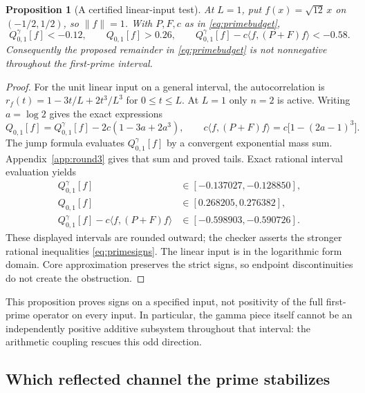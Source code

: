 \documentclass[11pt]{article}
\numberwithin{equation}{section}
\newtheorem{proposition}[theorem]{Proposition}
\theoremstyle{definition}
\theoremstyle{remark}
\newcommand{\norm}[1]{\lVert#1\rVert}
\newcommand{\ip}[2]{\langle#1,#2\rangle}
\newcommand{\Qgam}{Q^{\gamma}}
\begin{document}
\begin{proposition}[A certified linear-input test]\label{prop:primestabilizes}
At $L=1$, put $f(x)=\sqrt{12}\,x$ on $(-1/2,1/2)$, so $\norm f=1$.
With $P,F,c$ as in \eqref{eq:primebudget},
\begin{equation}
\Qgam_{0,1}[f]<-0.12,\qquad Q_{0,1}[f]>0.26,\qquad
\Qgam_{0,1}[f]-c\ip f{(P+F)f}<-0.58.
\label{eq:primesigns}
\end{equation}
Consequently the proposed remainder in \eqref{eq:primebudget} is not
nonnegative throughout the first-prime interval.
\end{proposition}
\begin{proof}
For the unit linear input on a general interval, the autocorrelation is
$r_f(t)=1-3t/L+2t^3/L^3$ for $0\leq t\leq L$. At $L=1$ only $n=2$
is active. Writing $a=\log2$ gives the exact expressions
\[
Q_{0,1}[f]=\Qgam_{0,1}[f]-2c(1-3a+2a^3),\qquad
c\ip f{(P+F)f}=c\bigl[1-(2a-1)^3\bigr].
\]
The jump formula evaluates $\Qgam_{0,1}[f]$ by a convergent exponential
mass sum. Appendix~\ref{app:round3} gives that sum and proved tails.
Exact rational interval evaluation yields
\begin{align*}
\Qgam_{0,1}[f]&\in[-0.137027,-0.128850],\\
Q_{0,1}[f]&\in[0.268205,0.276382],\\
\Qgam_{0,1}[f]-c\ip f{(P+F)f}&\in[-0.598903,-0.590726].
\end{align*}
These displayed intervals are rounded outward; the checker asserts the
stronger rational inequalities \eqref{eq:primesigns}. The linear input is
in the logarithmic form domain. Core approximation preserves the strict
signs, so endpoint discontinuities do not create the obstruction.
\end{proof}

This proposition proves signs on a specified input, not positivity of the
full first-prime operator on every input. In particular, the gamma piece
itself cannot be an independently positive additive subsystem throughout
that interval: the arithmetic coupling rescues this odd direction.

\subsection{Which reflected channel the prime stabilizes}
\end{document}

